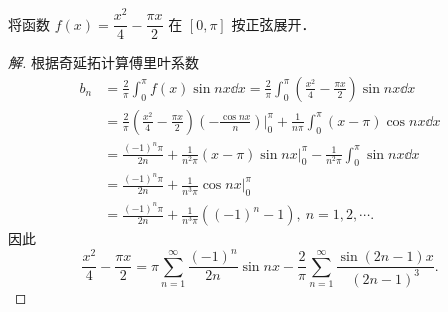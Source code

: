 \begin{example}\label{ex:14-3-2}
将函数 $f(x)=\dfrac{x^{2}}{4}-\dfrac{\pi x}{2}$ 在 $[0,\pi]$ 按正弦展开．
\end{example}

\begin{proof}[解]
根据奇延拓计算傅里叶系数
\[
\begin{aligned}
b_{n}&=\frac{2}{\pi}\int_{0}^{\pi}f(x)\sin nx\dd x=\frac{2}{\pi}\int_{0}^{\pi}\left(\frac{x^{2}}{4}-\frac{\pi x}{2}\right)\sin nx\dd x\\
&=\frac{2}{\pi}\left(\frac{x^{2}}{4}-\frac{\pi x}{2}\right)\left(-\frac{\cos nx}{n}\right)\bigg|_{0}^{\pi}
+\frac{1}{n\pi}\int_{0}^{\pi}(x-\pi)\cos nx\dd x\\
&=\frac{(-1)^{n}\pi}{2n}+\frac{1}{n^{2}\pi}(x-\pi)\sin nx\bigg|_{0}^{\pi}
-\frac{1}{n^{2}\pi}\int_{0}^{\pi}\sin nx\dd x\\
&=\frac{(-1)^{n}\pi}{2n}+\frac{1}{n^{3}\pi}\cos nx\bigg|_{0}^{\pi}\\
&=\frac{(-1)^{n}\pi}{2n}+\frac{1}{n^{3}\pi}\left((-1)^{n}-1\right),\ n=1,2,\cdots.
\end{aligned}
\]
因此
\[
\frac{x^{2}}{4}-\frac{\pi x}{2}=\pi\sum_{n=1}^{\infty}\frac{(-1)^{n}}{2n}\sin nx-\frac{2}{\pi}\sum_{n=1}^{\infty}\frac{\sin(2n-1)x}{(2n-1)^{3}}.
\]
\end{proof}

